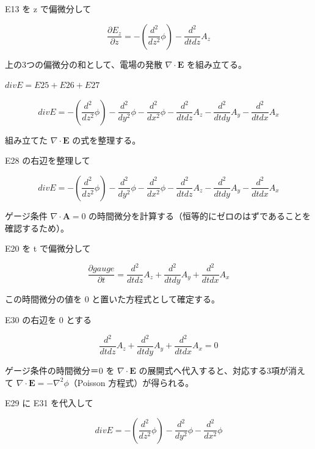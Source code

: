 \documentclass[dvipdfmx,a4paper,11pt]{jsarticle}
\begin{document}
E13 を z で偏微分して

\begin{equation}
  \frac{\partial E_z}{\partial z} = -\left(\frac{d^2}{d z^2} \phi\right)-\frac{d^2}{d t d z} A_{z}
  \label{eq:E27}
\end{equation}

上の3つの偏微分の和として、電場の発散 $\nabla\cdot\mathbf E$ を組み立てる。

$divE = E25 + E26 + E27$

\begin{equation}
  divE = -\left(\frac{d^2}{d z^2} \phi\right)-\frac{d^2}{d y^2} \phi-\frac{d^2}{d x^2} \phi-\frac{d^2}{d t d z} A_{z}-\frac{d^2}{d t d y} A_{y}-\frac{d^2}{d t d x} A_{x}
  \label{eq:E28}
\end{equation}

組み立てた $\nabla\cdot\mathbf E$ の式を整理する。

E28 の右辺を整理して

\begin{equation}
  divE = -\left(\frac{d^2}{d z^2} \phi\right)-\frac{d^2}{d y^2} \phi-\frac{d^2}{d x^2} \phi-\frac{d^2}{d t d z} A_{z}-\frac{d^2}{d t d y} A_{y}-\frac{d^2}{d t d x} A_{x}
  \label{eq:E29}
\end{equation}

ゲージ条件 $\nabla\cdot\mathbf A=0$ の時間微分を計算する（恒等的にゼロのはずであることを確認するため）。

E20 を t で偏微分して

\begin{equation}
  \frac{\partial gauge}{\partial t} = \frac{d^2}{d t d z} A_{z}+\frac{d^2}{d t d y} A_{y}+\frac{d^2}{d t d x} A_{x}
  \label{eq:E30}
\end{equation}

この時間微分の値を 0 と置いた方程式として確定する。

E30 の右辺を 0 とする

\begin{equation}
  \frac{d^2}{d t d z} A_{z}+\frac{d^2}{d t d y} A_{y}+\frac{d^2}{d t d x} A_{x} = 0
  \label{eq:E31}
\end{equation}

ゲージ条件の時間微分＝0 を $\nabla\cdot\mathbf E$ の展開式へ代入すると、対応する3項が消えて $\nabla\cdot\mathbf E=-\nabla^2\phi$（Poisson 方程式）が得られる。

E29 に E31 を代入して

\begin{equation}
  divE = -\left(\frac{d^2}{d z^2} \phi\right)-\frac{d^2}{d y^2} \phi-\frac{d^2}{d x^2} \phi
  \label{eq:E32}
\end{equation}
\end{document}
